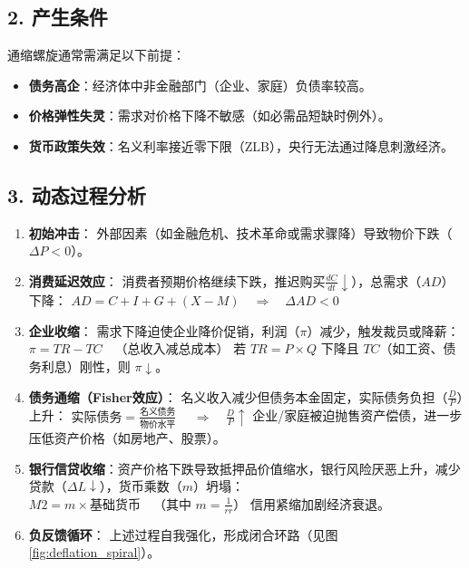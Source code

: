 \subsection*{2. 产生条件}
通缩螺旋通常需满足以下前提：
\begin{itemize}[nosep]
    \item \textbf{债务高企}：经济体中非金融部门（企业、家庭）负债率较高。
    \item \textbf{价格弹性失灵}：需求对价格下降不敏感（如必需品短缺时例外）。
    \item \textbf{货币政策失效}：名义利率接近零下限（ZLB），央行无法通过降息刺激经济。
\end{itemize}

\subsection*{3. 动态过程分析}
\begin{enumerate}
    \item \textbf{初始冲击}：  
    外部因素（如金融危机、技术革命或需求骤降）导致物价下跌（$\Delta P < 0$）。          
    \item \textbf{消费延迟效应}：       消费者预期价格继续下跌，推迟购买$\frac{dC}{dt} \downarrow$），总需求（$AD$）下降：     
    $
    AD = C + I + G + (X - M) \quad \Rightarrow \quad \Delta AD < 0
    $         
    \item \textbf{企业收缩}：       需求下降迫使企业降价促销，利润（$\pi$）减少，触发裁员或降薪：     $ \pi = TR - TC \quad \text{（总收入减总成本）} $     若 $TR = P \times Q$ 下降且 $TC$（如工资、债务利息）刚性，则 $\pi \downarrow$。          
    \item \textbf{债务通缩（Fisher效应）}：       名义收入减少但债务本金固定，实际债务负担（$\frac{D}{P}$）上升：     
    $ \text{实际债务} = \frac{\text{名义债务}}{\text{物价水平}} $  $\quad \Rightarrow \quad \frac{D}{P} \uparrow $     企业/家庭被迫抛售资产偿债，进一步压低资产价格（如房地产、股票）。         
    \item \textbf{银行信贷收缩}：资产价格下跌导致抵押品价值缩水，银行风险厌恶上升，减少贷款（$\Delta L \downarrow$），货币乘数（$m$）坍塌：     $ M2 = m \times \text{基础货币} \quad \text{（其中 } m = \frac{1}{rr} \text{）} $ 信用紧缩加剧经济衰退。
    \item \textbf{负反馈循环}：  
    上述过程自我强化，形成闭合环路（见图\ref{fig:deflation_spiral}）。
\end{enumerate}


